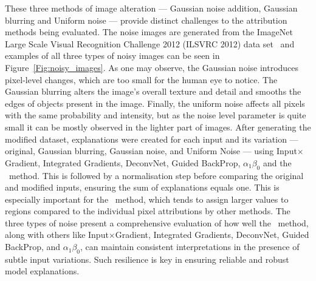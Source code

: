 These three methods of image alteration --- Gaussian noise addition, Gaussian blurring and Uniform noise --- provide distinct challenges to the attribution methods being evaluated. The noise images are generated from the ImageNet Large Scale Visual Recognition Challenge 2012 (ILSVRC 2012) data set~\cite{ILSVRC15} and examples of all three types of noisy images can be seen in Figure~\ref{Fig:noisy_images}. As one may observe, the Gaussian noise introduces pixel-level changes, which are too small for the human eye to notice. The Gaussian blurring alters the image's overall texture and detail and smooths the edges of objects present in the image. Finally, the uniform noise affects all pixels with the same probability and intensity, but as the noise level parameter is quite small it can be mostly observed in the lighter part of images. After generating the modified dataset, explanations were created for each input and its variation --- original, Gaussian blurring, Gaussian noise, and Uniform Noise --- using Input$\times$Gradient, Integrated Gradients, DeconvNet, Guided BackProp, \LRP\-$\alpha_1\beta_0$ and the \CTC\ method. This is followed by a normalisation step before comparing the original and modified inputs, ensuring the sum of explanations equals one. This is especially important for the \CTC\ method, which tends to assign larger values to regions compared to the individual pixel attributions by other methods. The three types of noise present a comprehensive evaluation of how well the \CTC\ method, along with others like Input$\times$Gradient, Integrated Gradients, DeconvNet, Guided BackProp, and \LRP\-$\alpha_1\beta_0$, can maintain consistent interpretations in the presence of subtle input variations. Such resilience is key in ensuring reliable and robust model explanations.


